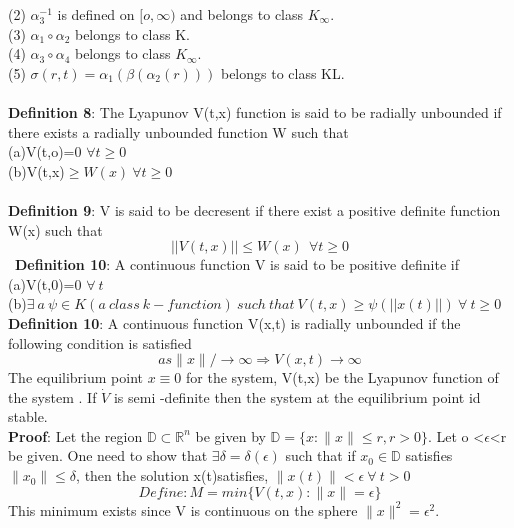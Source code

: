\documentclass[a4paper,12pt]{report}
\numberwithin{equation}{section}
\begin{document}
(2) $\alpha_{3}^{-1}$ is defined on $[o,\infty)$ and belongs to class $K_{\infty}$.\\
(3) $\alpha_{1} \circ \alpha_{2}$ belongs to class K. \\
(4) $\alpha_{3}\circ \alpha_{4}$ belongs to class $K_{\infty}$. \\
(5) $\sigma (r,t)= \alpha_{1} (\beta(\alpha_{2}(r)))$ belongs to class KL. \\ \\
\textbf{Definition 8}: The Lyapunov V(t,x) function is said to be radially unbounded  if there exists a radially unbounded function W such that \\
(a)V(t,o)=0 $\forall t \geq 0 $ \\
(b)V(t,x)$\geq W(x) \ \forall t \geq 0  $ 
\\ \\
\textbf{Definition 9}: V is said to be decresent if there exist a positive definite function W(x) such that 
\begin{equation}
||V (t,x)||\leq W(x) \ \ \forall t \geq 0
\end{equation}\
\textbf{Definition 10}: A continuous function V is said to be positive definite if \\
(a)V(t,0)=0 $\forall \ t $ \\
(b)$\exists \ a \ \psi \in K (a \ class \ k-function) \ such \ that \ V(t,x) \geq \psi (||x(t)||) \ \forall \ t\geq 0 $ \\ 
\textbf{Definition 10}: A continuous function V(x,t) is radially unbounded if the following condition is satisfied 
\begin{equation*}
as \|x\|/ \to \infty \Longrightarrow V(x,t)\to \infty 
\end{equation*}
\theorem The equilibrium point $x\equiv 0$ for the system, V(t,x) be the Lyapunov function of the system . If $\dot{V}$ is semi -definite then the system at the equilibrium point id stable.\\
\textbf{Proof}: Let the region $\mathbb{D}\subset \mathbb{R}^n$ be given by $\mathbb{D}= \{ x:\|x\|\leq r,r>0\}$. Let o
<$\epsilon$<r be given. One need to show that $\exists \delta=\delta (\epsilon)$ such that if $x_{0} \in \mathbb{D}$ satisfies $\|x_{0}\|\leq \delta$, then the solution x(t)satisfies, $\|x(t)\|< \epsilon \ \forall \ t>0$ 
\begin{equation*}
Define: M=min\{ V(t,x): \|x\| = \epsilon \}
\end{equation*} 
This minimum exists since V is continuous on the sphere $\|x\|^{2}=\epsilon^{2}$.\\
\end{document}
